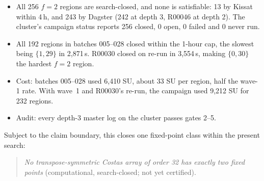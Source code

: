 \documentclass[11pt,a4paper]{article}
\theoremstyle{definition}
\newcommand{\st}[1]{\textsf{#1}}
\begin{document}
\begin{itemize}
\item All 256 $f=2$ regions are \st{search-closed}, and none is satisfiable: 13 by
Kissat within 4\,h, and 243 by Dagster (242 at depth 3, R00046 at depth 2). The cluster's
campaign status reports 256 closed, 0 open, 0 failed and 0 never run.
\item All 192 regions in batches 005--028 closed within the 1-hour cap, the slowest
being $\{1,29\}$ in 2{,}871\,s. R00030 closed on re-run in 3{,}554\,s, making $\{0,30\}$ the
hardest $f=2$ region.
\item Cost: batches 005--028 used 6{,}410 SU, about 33 SU per region, half the wave-1
rate. With wave~1 and R00030's re-run, the campaign used 9{,}212 SU for 232 regions.
\item Audit: every depth-3 master log on the cluster passes gates 2--5.
\end{itemize}

Subject to the claim boundary, this closes one fixed-point class within the present search:
\begin{quote}
\emph{No transpose-symmetric Costas array of order 32 has exactly two fixed points}
(computational, \st{search-closed}; not yet certified).
\end{quote}
\end{document}
